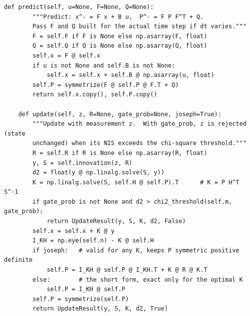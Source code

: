 \begin{lstlisting}[caption={The predict and update steps of the \code{KalmanFilter} class (from \code{code/ch18\_kalman.py}). \code{predict} accepts \code{F} and \code{Q} built for the actual time step; \code{update} returns the innovation, its covariance, the gain and the NIS, rejects the measurement when a gate probability is given and the NIS exceeds the chi-square threshold, and uses the Joseph form by default.},label={lst:ch18-core}]
    def predict(self, u=None, F=None, Q=None):
        """Predict: x^- = F x + B u,  P^- = F P F^T + Q.
        Pass F and Q built for the actual time step if dt varies."""
        F = self.F if F is None else np.asarray(F, float)
        Q = self.Q if Q is None else np.asarray(Q, float)
        self.x = F @ self.x
        if u is not None and self.B is not None:
            self.x = self.x + self.B @ np.asarray(u, float)
        self.P = symmetrize(F @ self.P @ F.T + Q)
        return self.x.copy(), self.P.copy()

    def update(self, z, R=None, gate_prob=None, joseph=True):
        """Update with measurement z.  With gate_prob, z is rejected (state
        unchanged) when its NIS exceeds the chi-square threshold."""
        R = self.R if R is None else np.asarray(R, float)
        y, S = self.innovation(z, R)
        d2 = float(y @ np.linalg.solve(S, y))
        K = np.linalg.solve(S, self.H @ self.P).T      # K = P H^T S^-1
        if gate_prob is not None and d2 > chi2_threshold(self.m, gate_prob):
            return UpdateResult(y, S, K, d2, False)
        self.x = self.x + K @ y
        I_KH = np.eye(self.n) - K @ self.H
        if joseph:   # valid for any K, keeps P symmetric positive definite
            self.P = I_KH @ self.P @ I_KH.T + K @ R @ K.T
        else:        # the short form, exact only for the optimal K
            self.P = I_KH @ self.P
        self.P = symmetrize(self.P)
        return UpdateResult(y, S, K, d2, True)
\end{lstlisting}

